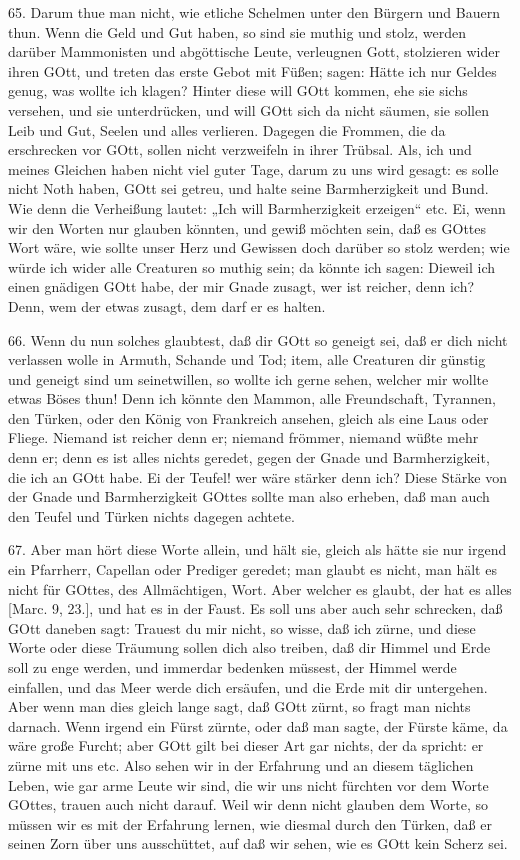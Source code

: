 65. Darum thue man nicht, wie etliche Schelmen unter den Bürgern und Bauern thun. Wenn die Geld und Gut haben, so sind sie muthig und stolz, werden darüber Mammonisten und abgöttische Leute, verleugnen Gott, stolzieren wider ihren GOtt, und treten das erste Gebot mit Füßen; sagen: Hätte ich nur Geldes genug, was wollte ich klagen? Hinter diese will GOtt kommen, ehe sie sichs versehen, und sie unterdrücken, und will GOtt sich da nicht säumen, sie sollen Leib und Gut, Seelen und alles verlieren. Dagegen die Frommen, die da erschrecken vor GOtt, sollen nicht verzweifeln in ihrer Trübsal. Als, ich und meines Gleichen haben nicht viel guter Tage, darum zu uns wird gesagt: es solle nicht Noth haben, GOtt sei getreu, und halte seine Barmherzigkeit und Bund. Wie denn die Verheißung lautet: „Ich will Barmherzigkeit erzeigen“ etc. Ei, wenn wir den Worten nur glauben könnten, und gewiß möchten sein, daß es GOttes Wort wäre, wie sollte unser Herz und Gewissen doch darüber so stolz werden; wie würde ich wider alle Creaturen so muthig sein; da könnte ich sagen: Dieweil ich einen gnädigen GOtt habe, der mir Gnade zusagt, wer ist reicher, denn ich? Denn, wem der etwas zusagt, dem darf er es halten.

66. Wenn du nun solches glaubtest, daß dir GOtt so geneigt sei, daß er dich nicht verlassen wolle in Armuth, Schande und Tod; item, alle Creaturen dir günstig und geneigt sind um seinetwillen, so wollte ich gerne sehen, welcher mir wollte etwas Böses thun! Denn ich könnte den Mammon, alle Freundschaft, Tyrannen, den Türken, oder den König von Frankreich ansehen, gleich als eine Laus oder Fliege. Niemand ist reicher denn er; niemand frömmer, niemand wüßte mehr denn er; denn es ist alles nichts geredet, gegen der Gnade und Barmherzigkeit, die ich an GOtt habe. Ei der Teufel! wer wäre stärker denn ich? Diese Stärke von der Gnade und Barmherzigkeit GOttes sollte man also erheben, daß man auch den Teufel und Türken nichts dagegen achtete.

67. Aber man hört diese Worte allein, und hält sie, gleich als hätte sie nur irgend ein Pfarrherr, Capellan oder Prediger geredet; man glaubt es nicht, man hält es nicht für GOttes, des Allmächtigen, Wort. Aber welcher es glaubt, der hat es alles [Marc. 9, 23.], und hat es in der Faust. Es soll uns aber auch sehr schrecken, daß GOtt daneben sagt: Trauest du mir nicht, so wisse, daß ich zürne, und diese Worte oder diese Träumung sollen dich also treiben, daß dir Himmel und Erde soll zu enge werden, und immerdar bedenken müssest, der Himmel werde einfallen, und das Meer werde dich ersäufen, und die Erde mit dir untergehen. Aber wenn man dies gleich lange sagt, daß GOtt zürnt, so fragt man nichts darnach. Wenn irgend ein Fürst zürnte, oder daß man sagte, der Fürste
käme, da wäre große Furcht; aber GOtt gilt bei dieser Art gar nichts, der da spricht: er zürne mit uns etc. Also sehen wir in der Erfahrung und an diesem täglichen Leben, wie gar arme Leute wir sind, die wir uns nicht fürchten vor dem Worte GOttes, trauen auch nicht darauf. Weil wir denn nicht glauben dem Worte, so müssen wir es mit der Erfahrung lernen, wie diesmal durch den Türken, daß er seinen Zorn über uns ausschüttet, auf daß wir sehen, wie es GOtt kein Scherz sei.

